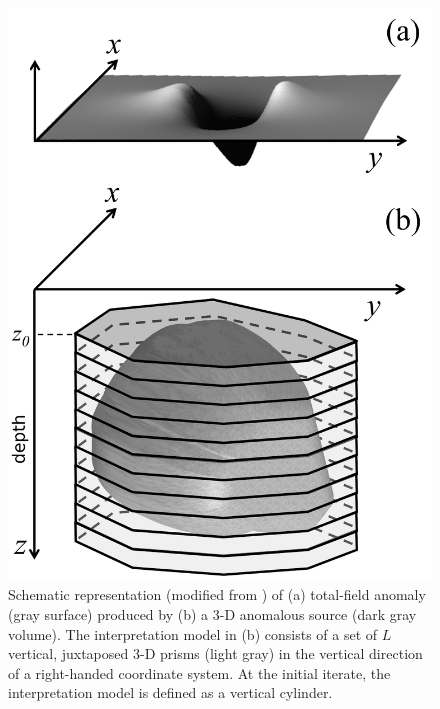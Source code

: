 
\begin{figure}
    \centering
    \includegraphics[scale=1]{figures/observed_data.png}
    \caption{Schematic representation (modified from \cite{oliveirajr-barbosa2013}) of (a) total-field anomaly (gray surface) produced by (b) a 3-D anomalous source (dark gray volume). The interpretation model in (b) consists of a set of $L$ vertical, juxtaposed 3-D prisms (light gray) in the vertical direction of a right-handed coordinate system. At the initial iterate, the interpretation model is defined as a vertical cylinder.}
    \label{fig:obs}
\end{figure}

